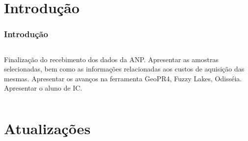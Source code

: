 \documentclass[aspectratio=169]{beamer} %
\begin{document}
\section{Introdução}

{

{ \begin{frame}
\begin{flushright}
\frametitle{Introdução}
\end{flushright}


\begin{flushright}
    \begin{columns}
        \centering
        
        \centering
	   Finalização do recebimento dos dados da ANP.
       Apresentar as amostras selecionadas, bem como as informações relacionadas aos custos de aquisição das mesmas.
	   Apresentar os avanços na ferramenta GeoPR4, Fuzzy Lakes, Odisséia.
	   Apresentar o aluno de IC.   
    \end{columns}

\end{flushright}


\end{frame} }





\section{Atualizações} %






}
\end{document}
